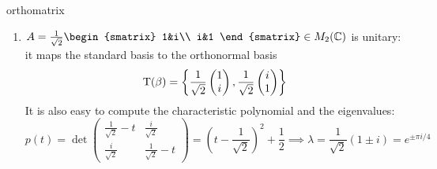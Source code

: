 \begin{examples}{}{orthomatrix}
\begin{enumerate}
		\item $A=\frac 1{\sqrt 2}
		\begin{smatrix}
			1&i\\
			i&1
		\end{smatrix}
		\in M_2(\C)$ is unitary: it maps the standard basis to the orthonormal basis 
	  \[
	  	\mathrm{T}(\beta) =\left\{\frac 1{\sqrt 2}\begin{pmatrix}1\\i\end{pmatrix}, \frac 1{\sqrt 2}\begin{pmatrix}i\\1\end{pmatrix}\right\}
	  \]
	  It is also easy to compute the characteristic polynomial and the eigenvalues:
	  \[
		  p(t)=\det
		  \begin{pmatrix}
			  \frac 1{\sqrt 2}-t&\frac i{\sqrt 2}\\
			  \frac i{\sqrt 2}&\frac 1{\sqrt 2}-t
		  \end{pmatrix} 
		  =\left(t-\frac 1{\sqrt 2}\right)^2+\frac 12
		  \implies \lambda=\frac 1{\sqrt 2}(1\pm i) \tag{modulus 1!}
		  =e^{\pm\pi i/4}
	  \]
	

\end{enumerate}
\end{examples}
